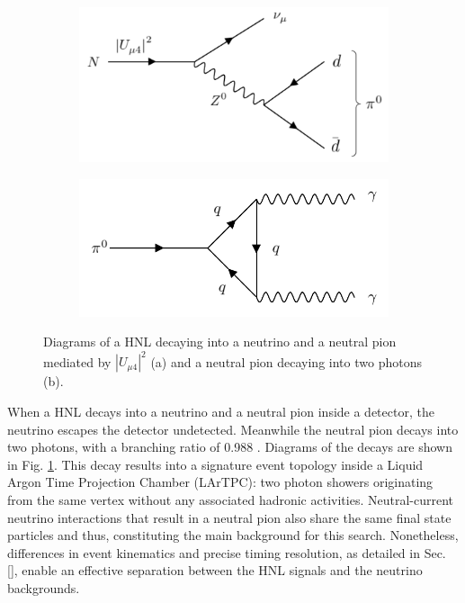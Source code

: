\begin{figure}[htbp!]
\begin{subfigure}[h]{0.49\linewidth}
\centering    
\includegraphics[width=\linewidth]{N_to_pi0_edit}
\caption{}
\end{subfigure}
\hfill
\begin{subfigure}[h]{0.49\linewidth}
\centering    
\includegraphics[width=\linewidth]{pi0_to_gam}
\caption{}
\end{subfigure}%
\caption[decayDiagram]{
Diagrams of a HNL decaying into a neutrino and a neutral pion mediated by $|U_{\mu4}|^{2}$ (a) and a neutral pion decaying into two photons (b).
}\label{fig:decayDiagram}
\end{figure}

When a HNL decays into a neutrino and a neutral pion inside a detector, the neutrino escapes the detector undetected.
Meanwhile the neutral pion decays into two photons, with a branching ratio of 0.988 \cite{pi0}. 
Diagrams of the decays are shown in Fig. \ref{fig:decayDiagram}.
This decay results into a signature event topology inside a Liquid Argon Time Projection Chamber (LArTPC): two photon showers originating from the same vertex without any associated hadronic activities.
Neutral-current neutrino interactions that result in a neutral pion also share the same final state particles and thus, constituting the main background for this search.
Nonetheless, differences in event kinematics and precise timing resolution, as detailed in Sec. \ref{}, enable an effective separation between the HNL signals and the neutrino backgrounds. 

